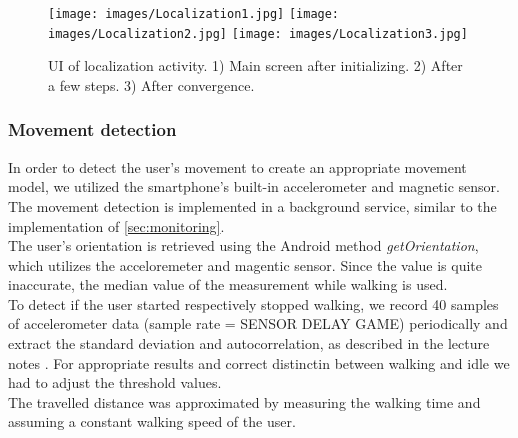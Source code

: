 \documentclass[12pt]{article}
\begin{document}
\begin{figure}
	\centering
	\texttt{[image: images/Localization1.jpg]}	\texttt{[image: images/Localization2.jpg]}
	\texttt{[image: images/Localization3.jpg]}
	\caption{UI of localization activity. 1) Main screen after initializing. 2) After a few steps. 3) After convergence. }
	\label{fig:localization}
\end{figure}

\subsubsection*{Movement detection}\label{sec:movement}
In order to detect the user's movement to create an appropriate movement model, we utilized the smartphone's built-in accelerometer and magnetic sensor. The movement detection is implemented in a background service, similar to the implementation of \ref{sec:monitoring}.\\
The user's orientation is retrieved using the Android method \textit{getOrientation}, which utilizes the acceloremeter and magentic sensor. Since the value is quite inaccurate, the median value of the measurement while walking is used.\\
To detect if the user started respectively stopped walking, we record 40 samples of accelerometer data (sample rate = SENSOR DELAY GAME) periodically and extract the standard deviation and autocorrelation, as described in the lecture notes \cite{lecturenotes}. For appropriate results and correct distinctin between walking and idle we had to adjust the threshold values.\\
The travelled distance was approximated by measuring the walking time and assuming a constant walking speed of the user.
\end{document}
